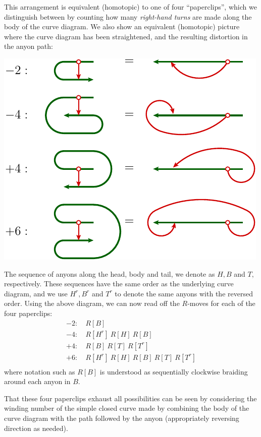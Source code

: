\documentclass[aps, prl, letterpaper, twocolumn, superscriptaddress, notitlepage, 10pt]{revtex4-1}
\begin{document}
This arrangement is equivalent (homotopic) to one of four 
``paperclips'', which we distinguish between by counting how
many \emph{right-hand turns} are made along the body of the curve diagram.
We also show an equivalent (homotopic) picture where the
curve diagram has been straightened, and the resulting distortion
in the anyon path:
\begin{center}
\includegraphics[]{pic-paperclip.pdf}
\end{center}
The sequence of anyons along the head, body and tail, we denote as $H, B$ and $T,$
respectively.
These sequences have the same order as the underlying curve diagram, and 
we use
$H^r, B^r$ and $T^r$ to denote the same anyons with the reversed order.
Using the above diagram, we can now read off the $R$-moves for each
of the four paperclips:
\begin{align*}
-2:&\ R[B] \\
-4:&\ R[H^r]\ R[H]\ R[B] \\
+4:&\ R[B]\ R[T]\ R[T^r] \\
+6:&\ R[H^r]\ R[H]\ R[B]\ R[T]\ R[T^r] \\
\end{align*}
where notation such as $R[B]$ is understood as sequentially clockwise braiding around
each anyon in $B$.

That these four paperclips exhaust all possibilities can be seen by
considering the winding number of the simple closed curve made
by combining the body of the curve diagram with the path followed by
the anyon (appropriately reversing direction as needed).
\end{document}
